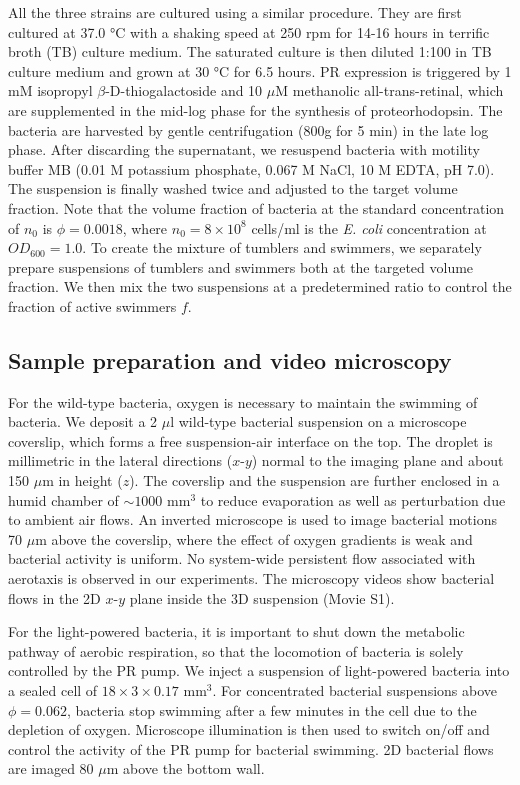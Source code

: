 All the three strains are cultured using a similar procedure. They are first cultured at 37.0 °C with a shaking speed at 250 rpm for 14-16 hours in terrific broth (TB) culture medium. The saturated culture is then diluted 1:100 in TB culture medium and grown at 30 °C for 6.5 hours. PR expression is triggered by 1 mM isopropyl $\beta$-D-thiogalactoside and 10 $\mu$M methanolic all-trans-retinal, which are supplemented in the mid-log phase for the synthesis of proteorhodopsin. The bacteria are harvested by gentle centrifugation (800g for 5 min) in the late log phase. After discarding the supernatant, we resuspend bacteria
with motility buffer MB (0.01 M potassium phosphate, 0.067 M NaCl, 10 M EDTA, pH 7.0). The suspension is finally washed twice and adjusted to the target volume fraction. Note that the volume fraction of bacteria at the standard concentration of $n_0$ is $\phi = 0.0018$, where $n_0 = 8 \times 10^8$ cells/ml is the \textit{E. coli} concentration at $OD_{600} = 1.0$. To create the mixture of tumblers and swimmers, we separately prepare suspensions of tumblers and swimmers both at the targeted volume fraction. We then mix the two suspensions at a predetermined ratio to control the fraction of active swimmers $f$.



\subsection{Sample preparation and video microscopy}
For the wild-type bacteria, oxygen is necessary to maintain the swimming of bacteria. We deposit a 2 $\mu$l wild-type bacterial suspension on a microscope coverslip, which forms a free suspension-air interface on the top. The droplet is millimetric in the lateral directions ($x$-$y$) normal to the imaging plane and about 150 $\mu$m in height ($z$). The coverslip and the suspension are further enclosed in a humid chamber of $\sim 1000$
mm$^3$ to reduce evaporation as well as perturbation due to ambient air flows. An inverted microscope is used to image bacterial motions 70 $\mu$m above the coverslip, where the effect of oxygen gradients is weak and bacterial activity is uniform. No system-wide persistent flow associated with aerotaxis is observed in our experiments. The microscopy videos show bacterial flows in the 2D $x$-$y$ plane inside the 3D suspension (Movie S1).

For the light-powered bacteria, it is important to shut down the metabolic pathway of aerobic respiration, so that the locomotion of bacteria is solely controlled by the PR pump. We inject a suspension of light-powered bacteria into a sealed cell of $18 \times 3 \times 0.17$ mm$^3$. For concentrated bacterial suspensions above $\phi = 0.062$, bacteria stop swimming after a few minutes in the cell due to the depletion of oxygen. Microscope illumination is then used to switch on/off and control the activity of the PR pump for bacterial swimming. 2D bacterial flows are imaged 80 $\mu$m above the bottom wall.


